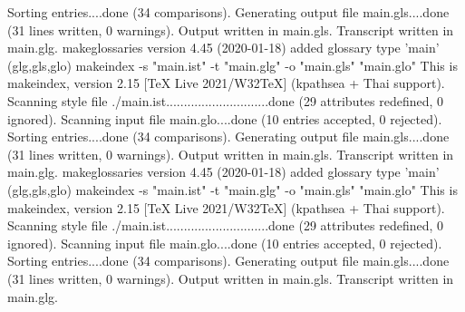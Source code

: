 Sorting entries....done (34 comparisons).
Generating output file main.gls....done (31 lines written, 0 warnings).
Output written in main.gls.
Transcript written in main.glg.
makeglossaries version 4.45 (2020-01-18)
added glossary type 'main' (glg,gls,glo)
makeindex  -s "main.ist" -t "main.glg" -o "main.gls" "main.glo"
This is makeindex, version 2.15 [TeX Live 2021/W32TeX] (kpathsea + Thai support).
Scanning style file ./main.ist.............................done (29 attributes redefined, 0 ignored).
Scanning input file main.glo....done (10 entries accepted, 0 rejected).
Sorting entries....done (34 comparisons).
Generating output file main.gls....done (31 lines written, 0 warnings).
Output written in main.gls.
Transcript written in main.glg.
makeglossaries version 4.45 (2020-01-18)
added glossary type 'main' (glg,gls,glo)
makeindex  -s "main.ist" -t "main.glg" -o "main.gls" "main.glo"
This is makeindex, version 2.15 [TeX Live 2021/W32TeX] (kpathsea + Thai support).
Scanning style file ./main.ist.............................done (29 attributes redefined, 0 ignored).
Scanning input file main.glo....done (10 entries accepted, 0 rejected).
Sorting entries....done (34 comparisons).
Generating output file main.gls....done (31 lines written, 0 warnings).
Output written in main.gls.
Transcript written in main.glg.
